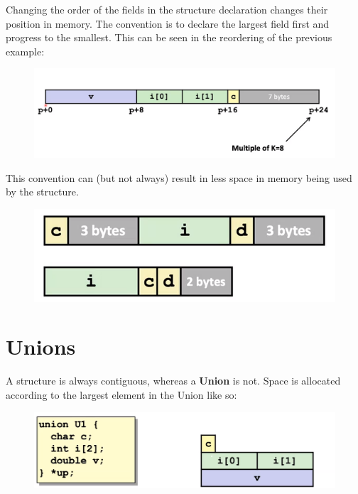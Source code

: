 \documentclass[12pt]{book}
\begin{document}
Changing the order of the fields in the structure declaration changes their position in
memory. The convention is to declare the largest field first and progress to the smallest.
This can be seen in the reordering of the previous example:
\begin{figure}[h]
        \centering
        \includegraphics[scale = 0.4]{./figures/alignArrange}
\end{figure}

This convention can (but not always) result in less space in memory being used by the
structure.
\begin{figure}[h]
        \centering
        \includegraphics[scale = 0.4]{./figures/alignEx}
\end{figure}

\section*{Unions}
A structure is always contiguous, whereas a \textbf{Union} is not.
Space is allocated according to the largest element in the Union like so:
\begin{figure}[h]
        \centering
        \includegraphics[scale = 0.4]{./figures/union}
\end{figure}
\pagebreak
\end{document}
